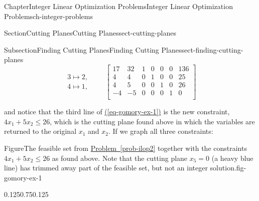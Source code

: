 \documentclass[oneside,10pt,]{book}
\newcommand{\xreffont}{\relax}
\numberwithin{equation}{section}
\newcommand{\amp}{&}
\begin{document}
\begin{chapterptx}{Chapter}{Integer Linear Optimization Problems}{}{Integer Linear Optimization Problems}{}{}{ch-integer-problems}
\begin{sectionptx}{Section}{Cutting Planes}{}{Cutting Planes}{}{}{sect-cutting-planes}
\begin{subsectionptx}{Subsection}{Finding Cutting Planes}{}{Finding Cutting Planes}{}{}{sect-finding-cutting-planes}
\begin{equation}
\begin{array}{r} 3 \mapsto 2, \\ 4 \mapsto 1, \end{array} \qquad \left[\begin{array}{rr|rrrr|r} 17 \amp 32 \amp 1 \amp 0 \amp 0 \amp 0 \amp 136\\ 4 \amp 4 \amp 0 \amp 1 \amp 0 \amp 0 \amp 25\\ 4 \amp 5 \amp 0 \amp 0 \amp 1 \amp 0 \amp 26\\ \hline -4 \amp -5 \amp 0 \amp 0 \amp 0 \amp 1 \amp 0\\ \end{array} \right]\label{eq-gomory-ex-2}
\end{equation}
%
\par
and notice that the third line of \hyperref[eq-gomory-ex-1]{({\xreffont\ref{eq-gomory-ex-1}})} is the new constraint, \(4x_1 + 5x_2 \leq 26\), which is the cutting plane found above in which the variables are returned to the original \(x_1\) and \(x_2\). If we graph all three constraints:%
\begin{figureptx}{Figure}{The feasible set from \hyperref[prob-ilop2]{Problem~{\xreffont\ref{prob-ilop2}}} together with the constraints \(4x_1+5x_2 \leq 26\) as found above.  Note that the cutting plane \(x_5=0\) (a heavy blue line) has trimmed away part of the feasible set, but not an integer solution.}{fig-gomory-ex-1}{}%
\begin{image}{0.125}{0.75}{0.125}{}%
%
\end{image}%
\tcblower
\end{figureptx}%

\end{subsectionptx}
\end{sectionptx}
\end{chapterptx}
\end{document}
